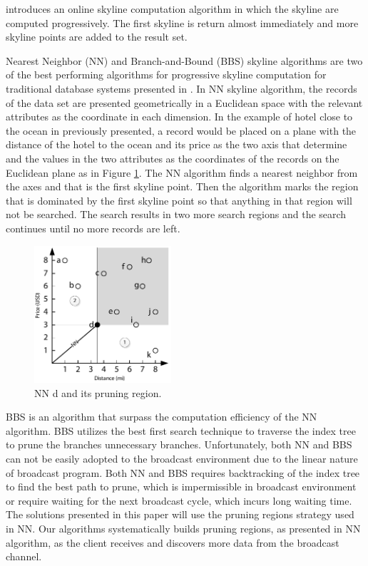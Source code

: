 \documentclass{sig-alternate}
\begin{document}
\cite{shooting_stars} introduces an online skyline computation algorithm in which the skyline
are computed progressively. The first skyline is return almost immediately and more skyline
points are added to the result set.

Nearest Neighbor (NN) and Branch-and-Bound (BBS) skyline algorithms are two of the best
performing algorithms for progressive skyline computation for traditional database systems
presented in \cite{progressive_skyline}. In NN skyline algorithm,
the records of the data set are presented geometrically in a Euclidean space with the relevant
attributes as the coordinate in each dimension. In the example of hotel close to the ocean in
previously presented, a record would be placed on a plane with the distance of the hotel to the ocean and
its price as the two axis that determine and the values in the two attributes as the coordinates
of the records on the Euclidean plane as in Figure \ref{fig:skyline_nn}. The NN algorithm finds a nearest neighbor from the
axes and that is the first skyline point. Then the algorithm marks the region that is dominated
by the first skyline point so that anything in that region will not be searched. The search results
in two more search regions and the search continues until no more records are left.

\begin{figure}[h]
\begin{center}
\includegraphics[width=2in]{Figures/skyline_nn.pdf}
\caption{\small NN d and its pruning region.
\label{fig:skyline_nn}}
\end{center}
\end{figure}

BBS is an algorithm that surpass the computation efficiency of the NN algorithm. BBS utilizes the
best first search technique to traverse the index tree to prune the branches unnecessary branches.
Unfortunately, both NN and BBS can not be easily adopted to the broadcast environment due
to the linear nature of broadcast program. Both NN and BBS requires backtracking of the index
tree to find the best path to prune, which is impermissible in broadcast environment or require waiting
for the next broadcast cycle, which incurs long waiting time. The solutions presented in this paper
will use the pruning regions strategy used in NN. Our algorithms systematically builds pruning regions,
as presented in NN algorithm, as the client receives and discovers more data from the broadcast
channel.
\end{document}
